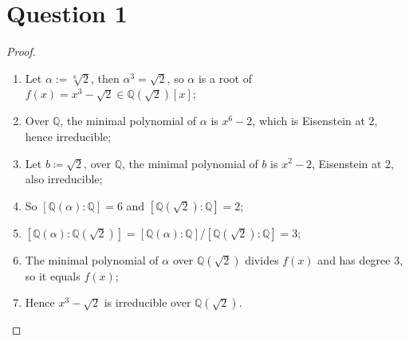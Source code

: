 \documentclass[12pt]{article}
\newcommand{\Q}{\mathbb{Q}}
\begin{document}
\section*{Question 1}
\begin{proof}
~
    \begin{enumerate}
\item Let $\alpha:=\sqrt[6]{2}$, then $\alpha^3=\sqrt{2}$, so $\alpha$ is a root of $f(x)=x^3-\sqrt{2}\in\Q(\sqrt{2})[x]$;
\item Over $\Q$, the minimal polynomial of $\alpha$ is $x^6-2$, which is Eisenstein at $2$, hence irreducible;
\item Let $b\coloneqq \sqrt{2}$, over $\Q$, the minimal polynomial of $b$ is $x^2-2$, Eisenstein at 2, also irreducible;
\item So $[\Q(\alpha):\Q]=6$ and $[\Q(\sqrt{2}):\Q]=2$;
\item $[\Q(\alpha):\Q(\sqrt{2})]=[\Q(\alpha):\Q]/[\Q(\sqrt{2}):\Q]=3$;
\item The minimal polynomial of $\alpha$ over $\Q(\sqrt{2})$ divides $f(x)$ and has degree $3$, so it equals $f(x)$;
\item Hence $x^3-\sqrt{2}$ is irreducible over $\Q(\sqrt{2})$.
\end{enumerate}
\end{proof}

\newpage
\end{document}
